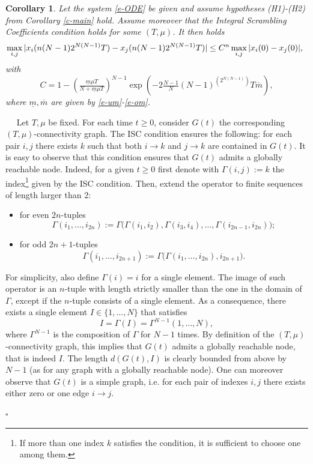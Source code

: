 \documentclass[journal]{article}
\newtheorem{corollary}[theorem]{Corollary}
\newenvironment{proof}{{\it Proof.}~~}{\hfill$\square$}
\begin{document}
\begin{corollary} Let the system \eqref{e-ODE} be given and assume hypotheses (H1)-(H2) from Corollary \ref{c-main} hold. Assume moreover that the Integral Scrambling Coefficients condition holds for some $(T,\mu)$. It then holds 
\begin{eqnarray}
&&\hspace{-5mm}\max_{i,j}|x_i(n(N-1)2^{N(N-1)}T)-x_j(n(N-1)2^{N(N-1)}T)| \leq C^n \max_{i,j}|x_i(0)-x_j(0)|, \label{est-ISC}
\end{eqnarray}
with 
$$C=1-\left( \tfrac{\underline{m}\mu T}{N+\underline{m}\mu T}    \right)^{N-1}\exp(-2\tfrac{N-1}{N}(N-1)^{(2^{N(N-1)})}T\overline{m}),$$
where $\underline{m},\overline{m}$ are given by \eqref{e-um}-\eqref{e-om}.
\end{corollary}
\begin{proof} Let $T,\mu$ be fixed. For each time $t\geq 0$, consider $G(t)$ the corresponding $(T,\mu)$-connectivity graph. The ISC condition ensures the following: for each pair $i,j$ there exists $k$ such that both $i\to k$ and $j\to k$ are contained in $G(t)$. It is easy to observe that this condition ensures that $G(t)$ admits a globally reachable node. Indeed, for a given $t\geq 0$ first denote with $\Gamma(i,j):=k$ the index\footnote{If more than one index $k$ satisfies the condition, it is sufficient to choose one among them.} given by the ISC condition. Then, extend the operator to finite sequences of length larger than 2:
\begin{itemize}
\item for  even $2n$-tuples
$$\Gamma(i_1,\ldots,i_{2n}):=\Gamma\big(\Gamma(i_1,i_2),\Gamma(i_3,i_4),\ldots,\Gamma(i_{2n-1},i_{2n})\big);$$
\item for  odd $2n+1$-tuples
$$\Gamma(i_1,\ldots,i_{2n+1}):=\Gamma\big(\Gamma(i_1,\ldots,i_{2n}),i_{2n+1}\big).$$
\end{itemize}

For simplicity, also define $\Gamma(i)=i$ for a single element. The image of such operator is an $n$-tuple with length strictly smaller than the one in the domain of $\Gamma$, except if the $n$-tuple consists of a single element. As a consequence, there exists a single element $I\in\{1,\ldots,N\}$ that satisfies 
$$I=\Gamma(I)=\Gamma^{N-1}(1,\ldots,N),$$
where $\Gamma^{N-1}$ is the composition of $\Gamma$ for $N-1$ times. By definition of the $(T,\mu)$-connectivity graph, this implies that $G(t)$ admits a globally reachable node, that is indeed $I$. The length $d(G(t),I)$ is clearly bounded from above by $N-1$ (as for any graph with a globally reachable node). One can moreover observe that $G(t)$ is a simple graph, i.e. for each pair of indexes $i,j$ there exists either zero or one edge $i\to j$.


\end{proof}
\end{document}
